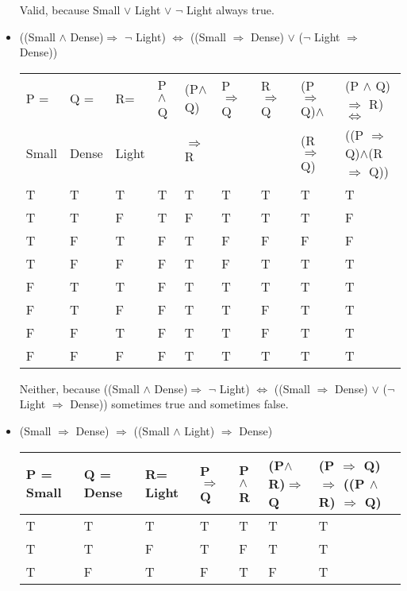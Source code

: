 \documentclass{article}
\begin{document}
\begin{itemize}
\begin{center}
\begin{tabular}{ |l|l|l|l|l|}
          \hline
        \end{tabular}
        \end{center}
        Valid, because Small $\vee$ Light $\vee$ $\neg$ Light always true.
    \item ((Small $\wedge$ Dense)$\Rightarrow$ $\neg$ Light) $\Leftrightarrow$ ((Small $\Rightarrow$ Dense) $\vee$ ($\neg$ Light $\Rightarrow$ Dense))
    \begin{center}
        \begin{tabular}{ |l|l|l|l|l|l|l|l|l|}
          \hline
          P =  &  Q =   &R= & P$\wedge$Q & (P$\wedge$Q)  &  P $\Rightarrow$ Q&R $\Rightarrow$ Q&(P $\Rightarrow$ Q)$\wedge$&(P $\wedge$ Q) $\Rightarrow$ R) $\Leftrightarrow$ \\ 
          Small&Dense&Light&&$\Rightarrow$ R& & &(R $\Rightarrow$ Q)&((P $\Rightarrow$ Q)$\wedge$(R $\Rightarrow$ Q))\\ \hline
          T & T &T&T&T&T&T&T&T\\ \hline
          T & T &F&T&F&T&T&T&F\\ \hline
          T & F &T&F&T&F&F&F&F\\ \hline
          T & F &F&F&T&F&T&T&T\\ \hline
          F & T &T&F&T&T&T&T&T\\ \hline
          F & T &F&F&T&T&F&T&T\\ \hline
          F & F &T&F&T&T&F&T&T\\ \hline
          F & F &F&F&T&T&T&T&T\\ \hline
        \end{tabular}
        \end{center}
        Neither, because ((Small $\wedge$ Dense)$\Rightarrow$ $\neg$ Light) $\Leftrightarrow$ ((Small $\Rightarrow$ Dense) $\vee$ ($\neg$ Light $\Rightarrow$ Dense)) sometimes true and sometimes false.
    \item (Small $\Rightarrow$ Dense) $\Rightarrow$ ((Small $\wedge$ Light) $\Rightarrow$ Dense)
    \begin{center}
      \begin{tabular}{ |l|l|l|l|l|l|l|}
        \hline
        P =  Small&  Q =  Dense &R= Light& P$\Rightarrow$Q & P$\wedge$R & (P$\wedge$R)$\Rightarrow$ Q&(P $\Rightarrow$ Q) $\Rightarrow$ ((P $\wedge$ R) $\Rightarrow$ Q)  \\ \hline
        T & T &T&T&T&T&T\\ \hline
        T & T &F&T&F&T&T\\ \hline
        T & F &T&F&T&F&T\\ \hline

\end{tabular}
\end{center}
\end{itemize}
\end{document}
